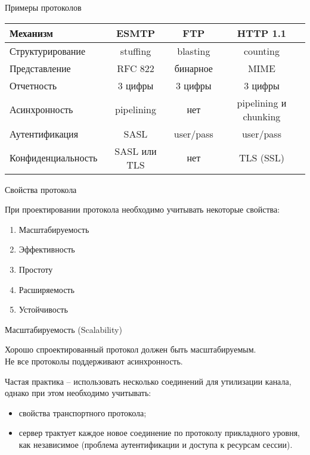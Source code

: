 \begin{frame}{Примеры протоколов}

	\scriptsize
	\begin{table}[ht]
	\centering
	\begin{tabular}[c]{l|c|c|c}
Механизм & ESMTP & FTP & HTTP 1.1\\
	\hline
Структурирование & stuffing & blasting & counting\\
Представление & RFC 822 & бинарное & MIME\\
Отчетность & 3 цифры & 3 цифры & 3 цифры\\
Асинхронность & pipelining & нет & pipelining и chunking\\
Аутентификация & SASL & user/pass & user/pass\\
Конфиденциальность & SASL или TLS & нет & TLS (SSL)\\
	\end{tabular}
	\end{table}
\end{frame}

\begin{frame}{Свойства протокола}

	При проектировании протокола необходимо учитывать некоторые свойства:
	\begin{enumerate}
		\item Масштабируемость
		\item Эффективность
		\item Простоту
		\item Расширяемость
		\item Устойчивость
	\end{enumerate}
\end{frame}

\begin{frame}{Масштабируемость (Scalability)}

	Хорошо спроектированный протокол должен быть масштабируемым.\\
	\bigskip
	Не все протоколы поддерживают асинхронность.

	Частая практика -- использовать несколько соединений для утилизации канала,  однако при этом необходимо учитывать:
	\begin{itemize}
		\item свойства транспортного протокола;
		\item сервер трактует каждое новое соединение по протоколу прикладного уровня,  как независимое (проблема аутентификации и доступа к ресурсам сессии). 
	\end{itemize}
\end{frame}

